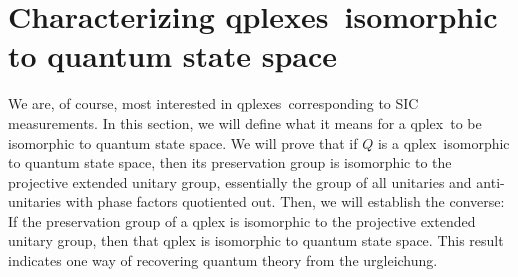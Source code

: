 \documentclass[aps,pra,superscriptaddress,10pt,tightenlines,twocolumn,nofootinbib]{revtex4}
\theoremstyle{remark}
\newcommand{\qp}{Q}
\newcommand{\qplex}{qplex}
\newcommand{\qplexes}{qplexes}
\begin{document}
 \section{Characterizing \qplexes\ isomorphic to quantum state space}
 \label{sec:character}
We are, of course, most interested in \qplexes\ corresponding to SIC measurements.  In this section, we will define what it means for a \qplex\ to be isomorphic to quantum state space.  We will prove that if $\qp$ is a \qplex\ isomorphic to quantum state space, then its preservation group is isomorphic to the projective extended unitary group, essentially the group of all unitaries and anti-unitaries with phase factors quotiented out.  Then, we will establish the converse: If the preservation group of a qplex is isomorphic to the projective extended unitary group, then that qplex is isomorphic to quantum state space.  This result indicates one way of recovering quantum theory from the urgleichung.
\end{document}
